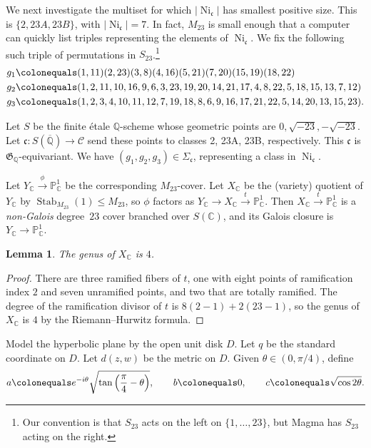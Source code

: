 \documentclass[12pt,reqno]{amsart}
\newcommand{\C}{\mathbb{C}}
\newcommand{\PP}{\mathbb{P}}
\newcommand{\Q}{\mathbb{Q}}
\newcommand{\Qbar}{{\overline{\Q}}}
\newcommand{\calC}{\mathcal{C}}
\newcommand{\cc}{\mathfrak{c}}
\newcommand{\GG}{\mathfrak{G}}
\DeclareMathOperator{\Ni}{Ni}
\DeclareMathOperator{\Stab}{Stab}
\newtheorem{lemma}[theorem]{Lemma}
\theoremstyle{definition}
\theoremstyle{remark}
\begin{document}
We next investigate the multiset for which $\lvert \Ni_\cc \rvert$ has smallest positive size.
This is $\{2,23A,23B\}$, with $\lvert \Ni_\cc \rvert = 7$.
In fact, $M_{23}$ is small enough that a computer can quickly list triples representing the elements of $\Ni_\cc$.
We fix the following such triple of permutations in $S_{23}$.\footnote{Our convention is that $S_{23}$ acts on the left on $\{1,\ldots,23\}$, but Magma has $S_{23}$ acting on the right.}
\begin{align*}
   g_1 &\colonequals (1,11)(2,23)(3,8)(4,16)(5,21)(7,20)(15,19)(18,22)  \\
   g_2 &\colonequals (1,2,11,10,16,9,6,3,23,19,20,14,21,17,4,8,22,5,18,15,13,7,12) \\
   g_3 &\colonequals (1,2,3,4,10,11,12,7,19,18,8,6,9,16,17,21,22,5,14,20,13,15,23). %
\end{align*}

Let $S$ be the finite \'etale $\Q$-scheme whose geometric points are $0,\sqrt{-23},-\sqrt{-23}$.
Let $\cc \colon S(\Qbar) \to \calC$ send these points to classes 2, 23A, 23B, respectively.
This $\cc$ is $\GG_\Q$-equivariant.
We have $(g_1,g_2,g_3) \in \Sigma_\cc$, representing a class in $\Ni_\cc$.

Let $Y_\C \stackrel{\phi}\to \PP^1_\C$ be the corresponding $M_{23}$-cover.
Let $X_\C$ be the (variety) quotient of $Y_\C$ by $\Stab_{M_{23}}(1) \le M_{23}$,
so $\phi$ factors as $Y_\C \to X_\C \stackrel{t}\to \PP^1_\C$.
Then $X_\C \stackrel{t}\to \PP^1_\C$ is a \emph{non-Galois} degree~$23$ cover branched over $S(\C)$,
and its Galois closure is $Y_\C \to \PP^1_\C$.

\begin{lemma}
    The genus of $X_\C$ is $4$.
\end{lemma}

\begin{proof}
There are three ramified fibers of $t$, one with eight points of ramification index $2$ and seven unramified points, and two that are totally ramified. 
The degree of the ramification divisor of $t$ is $8(2-1) + 2(23-1)$, so the genus of $X_\C$ is $4$ by the Riemann--Hurwitz formula.
\end{proof}

Model the hyperbolic plane by the open unit disk $D$.  
Let $q$ be the standard coordinate on $D$.  
Let $d(z,w)$ be the metric on $D$.
Given $\theta \in (0,\pi/4)$, define
\[
    a \colonequals e^{-i \theta} \sqrt{\tan\left(\frac{\pi}{4}-\theta\right)}, \qquad b \colonequals 0, \qquad c \colonequals \sqrt{\cos 2\theta}.
\]
\end{document}
